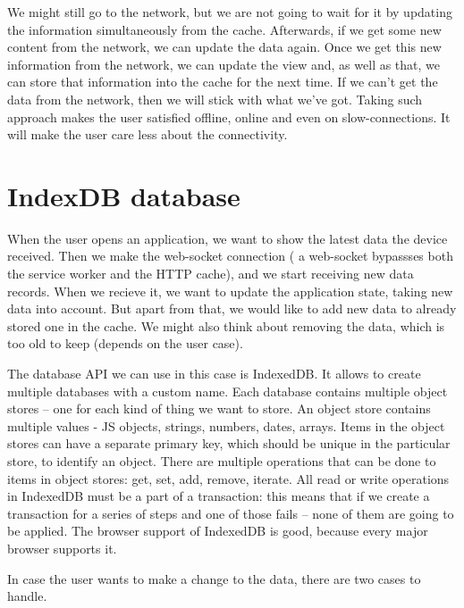 We might still go to the network, but we are not going to wait for it by updating the information simultaneously from the cache. Afterwards, if we get some new content from the network, we can update the data again. Once we get this new information from the network, we can update the view and, as well as that, we can store that information into the cache for the next time. If we can't get the data from the network, then we will stick with what we've got. Taking such approach makes the user satisfied offline, online and even on slow-connections. It will make the user care less about the connectivity. 

\section{IndexDB database}

When the user opens an application, we want to show the latest data the device received. Then we make the web-socket connection ( a web-socket bypassses both the service worker and the HTTP cache), and we start receiving new data records. When we recieve it, we want to update the application state, taking new data into account. But apart from that, we would like to add new data to already stored one in the cache. We might also think about removing the data, which is too old to keep (depends on the user case). 

The database API we can use in this case is IndexedDB. It allows to create multiple databases with a custom name. Each database contains multiple object stores -- one for each kind of thing we want to store. An object store contains multiple values - JS objects, strings, numbers, dates, arrays. Items in the object stores can have a separate primary key, which should be unique in the particular store, to identify an object. There are multiple operations that can be done to items in object stores: get, set, add, remove, iterate. All read or write operations in IndexedDB must be a part of a transaction: this means that if we create a transaction for a series of steps and one of those fails -- none of them are going to be applied. The browser support of IndexedDB is good, because every major browser supports it. 

In case the user wants to make a change to the data, there are two cases to handle. 

